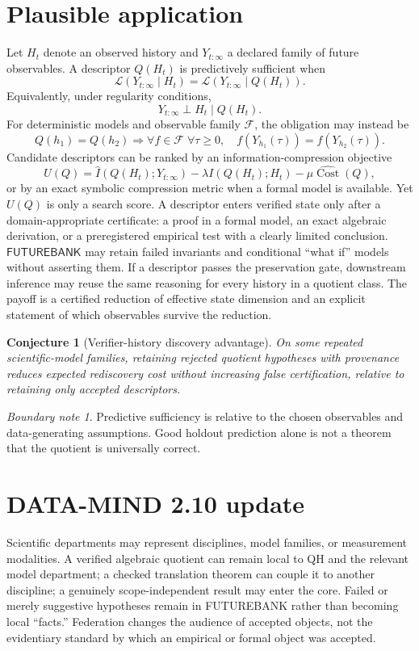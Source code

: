 \documentclass[11pt,oneside]{book}
\newtheorem{conjecture}[theorem]{Conjecture}
\theoremstyle{definition}
\theoremstyle{remark}
\newtheorem{boundary}[theorem]{Boundary note}
\newcommand{\FB}{\mathsf{FUTUREBANK}}
\newcommand{\Cost}{\operatorname{Cost}}
\begin{document}
\section{Plausible application}
Let \(H_t\) denote an observed history and \(Y_{t:\infty}\) a declared family of future observables.
A descriptor \(Q(H_t)\) is predictively sufficient when
\[
\mathcal L(Y_{t:\infty}\mid H_t)
=\mathcal L(Y_{t:\infty}\mid Q(H_t)).
\]
Equivalently, under regularity conditions,
\[
Y_{t:\infty}\perp H_t\mid Q(H_t).
\]
For deterministic models and observable family \(\mathcal F\), the obligation may instead be
\[
Q(h_1)=Q(h_2)
\Rightarrow
\forall f\in\mathcal F\;\forall\tau\ge0,
\quad f(Y_{h_1}(\tau))=f(Y_{h_2}(\tau)).
\]
Candidate descriptors can be ranked by an information-compression objective
\[
U(Q)=\widehat I(Q(H_t);Y_{t:\infty})
-\lambda I(Q(H_t);H_t)
-\mu\widehat{\Cost}(Q),
\]
or by an exact symbolic compression metric when a formal model is available. Yet \(U(Q)\) is only
a search score. A descriptor enters verified state only after a domain-appropriate certificate: a
proof in a formal model, an exact algebraic derivation, or a preregistered empirical test with a clearly
limited conclusion. \(\FB\) may retain failed invariants and conditional ``what if'' models without
asserting them. If a descriptor passes the preservation gate, downstream inference may reuse the same
reasoning for every history in a quotient class. The payoff is a certified reduction of effective state
dimension and an explicit statement of which observables survive the reduction.

\begin{conjecture}[Verifier-history discovery advantage]
On some repeated scientific-model families, retaining rejected quotient hypotheses with provenance
reduces expected rediscovery cost without increasing false certification, relative to retaining only
accepted descriptors.
\end{conjecture}

\begin{boundary}
Predictive sufficiency is relative to the chosen observables and data-generating assumptions. Good
holdout prediction alone is not a theorem that the quotient is universally correct.
\end{boundary}

\section{DATA-MIND 2.10 update}
Scientific departments may represent disciplines, model families, or measurement modalities. A
verified algebraic quotient can remain local to QH and the relevant model department; a checked
translation theorem can couple it to another discipline; a genuinely scope-independent result may
enter the core. Failed or merely suggestive hypotheses remain in FUTUREBANK rather than becoming
local ``facts.'' Federation changes the audience of accepted objects, not the evidentiary standard by
which an empirical or formal object was accepted.
\end{document}
